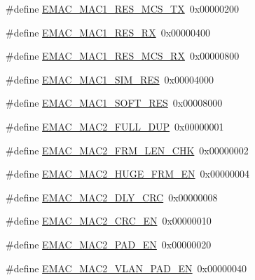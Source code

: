 \begin{DoxyCompactItemize}
\item 
\#define \hyperlink{group___e_m_a_c___private___macros_ga214cfe49444b5bac7866889384698037}{\-E\-M\-A\-C\-\_\-\-M\-A\-C1\-\_\-\-R\-E\-S\-\_\-\-M\-C\-S\-\_\-\-T\-X}~0x00000200
\item 
\#define \hyperlink{group___e_m_a_c___private___macros_ga8b6b11dbbef1c328f1ffa75a04d34649}{\-E\-M\-A\-C\-\_\-\-M\-A\-C1\-\_\-\-R\-E\-S\-\_\-\-R\-X}~0x00000400
\item 
\#define \hyperlink{group___e_m_a_c___private___macros_ga134a14de4a380ea61268d157a3f6ad1a}{\-E\-M\-A\-C\-\_\-\-M\-A\-C1\-\_\-\-R\-E\-S\-\_\-\-M\-C\-S\-\_\-\-R\-X}~0x00000800
\item 
\#define \hyperlink{group___e_m_a_c___private___macros_ga1ca6860eff6addc14ab0cff18d2e5a46}{\-E\-M\-A\-C\-\_\-\-M\-A\-C1\-\_\-\-S\-I\-M\-\_\-\-R\-E\-S}~0x00004000
\item 
\#define \hyperlink{group___e_m_a_c___private___macros_ga1f4a4efdfcb6cbba405aa3cc72ebf657}{\-E\-M\-A\-C\-\_\-\-M\-A\-C1\-\_\-\-S\-O\-F\-T\-\_\-\-R\-E\-S}~0x00008000
\item 
\#define \hyperlink{group___e_m_a_c___private___macros_gadde611f24c830f28cbaaabb358e9d985}{\-E\-M\-A\-C\-\_\-\-M\-A\-C2\-\_\-\-F\-U\-L\-L\-\_\-\-D\-U\-P}~0x00000001
\item 
\#define \hyperlink{group___e_m_a_c___private___macros_gace738963340abd7a362cd976d7d4ef96}{\-E\-M\-A\-C\-\_\-\-M\-A\-C2\-\_\-\-F\-R\-M\-\_\-\-L\-E\-N\-\_\-\-C\-H\-K}~0x00000002
\item 
\#define \hyperlink{group___e_m_a_c___private___macros_gaaec5d0dec2d7ec6f8a9cb76504c314ae}{\-E\-M\-A\-C\-\_\-\-M\-A\-C2\-\_\-\-H\-U\-G\-E\-\_\-\-F\-R\-M\-\_\-\-E\-N}~0x00000004
\item 
\#define \hyperlink{group___e_m_a_c___private___macros_ga0325d20d9053b4fb46d79222c7b36fca}{\-E\-M\-A\-C\-\_\-\-M\-A\-C2\-\_\-\-D\-L\-Y\-\_\-\-C\-R\-C}~0x00000008
\item 
\#define \hyperlink{group___e_m_a_c___private___macros_ga4d39d6e5a9c4286243c90e6d6c08d8fa}{\-E\-M\-A\-C\-\_\-\-M\-A\-C2\-\_\-\-C\-R\-C\-\_\-\-E\-N}~0x00000010
\item 
\#define \hyperlink{group___e_m_a_c___private___macros_ga8a27eea17b87852537d64ce0042d932a}{\-E\-M\-A\-C\-\_\-\-M\-A\-C2\-\_\-\-P\-A\-D\-\_\-\-E\-N}~0x00000020
\item 
\#define \hyperlink{group___e_m_a_c___private___macros_ga81f350fd10530eb20ce39d4d905b8a8a}{\-E\-M\-A\-C\-\_\-\-M\-A\-C2\-\_\-\-V\-L\-A\-N\-\_\-\-P\-A\-D\-\_\-\-E\-N}~0x00000040
\item 

\end{DoxyCompactItemize}
